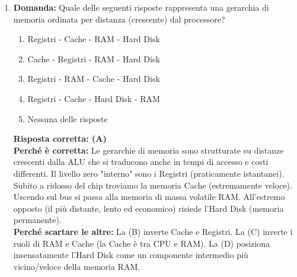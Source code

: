 \documentclass[12pt, a4paper]{article}
\begin{document}
\begin{enumerate}
    \item \textbf{Domanda:} Quale delle seguenti risposte rappresenta una gerarchia di memoria ordinata per distanza (crescente) dal processore?
    \begin{enumerate}[label=(\Alph*)]
        \item Registri - Cache - RAM - Hard Disk
        \item Cache - Registri - RAM - Hard Disk
        \item Registri - RAM - Cache - Hard Disk
        \item Registri - Cache - Hard Disk - RAM
        \item Nessuna delle risposte
    \end{enumerate}

\newpage
    
    \textbf{Risposta corretta: (A)} \\
    \textbf{Perché è corretta:} Le gerarchie di memoria sono strutturate su distanze crescenti dalla ALU che si traducono anche in tempi di accesso e costi differenti. Il livello zero "interno" sono i Registri (praticamente istantanei). Subito a ridosso del chip troviamo la memoria Cache (estremamente veloce). Uscendo sul bus si passa alla memoria di massa volatile RAM. All'estremo opposto (il più distante, lento ed economico) risiede l'Hard Disk (memoria permanente). \\
    \textbf{Perché scartare le altre:} La (B) inverte Cache e Registri. La (C) inverte i ruoli di RAM e Cache (la Cache è tra CPU e RAM). La (D) posiziona insensatamente l'Hard Disk come un componente intermedio più vicino/veloce della memoria RAM.


\end{enumerate}
\end{document}
